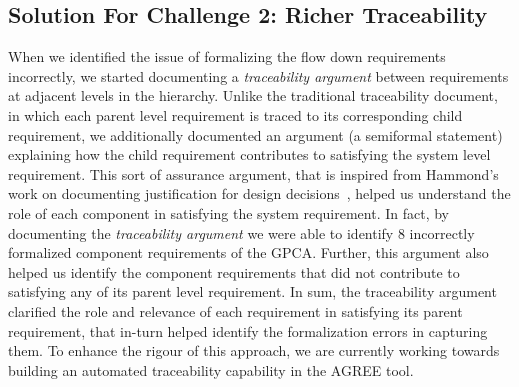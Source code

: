 %


\subsection {Solution For Challenge 2: Richer Traceability}

When we identified the issue of formalizing the flow down requirements incorrectly, we started documenting a \emph{traceability argument} between requirements at adjacent levels in the hierarchy. Unlike the traditional traceability document, in which each parent level requirement is traced to its corresponding child requirement, we additionally documented an argument (a semiformal statement) explaining how the child requirement contributes to satisfying the system level requirement. This sort of assurance argument, that is inspired from Hammond's work on documenting justification for design decisions~\cite{Hammond01:WiW}, helped us understand the role of each component in satisfying the system requirement. In fact, by documenting the \emph{traceability argument} we were able to identify 8 incorrectly formalized component requirements of the GPCA. Further, this argument also helped us identify the component requirements that did not contribute to satisfying any of its parent level requirement. In sum, the traceability argument clarified the role and relevance of each requirement in satisfying its parent requirement, that in-turn helped identify the formalization errors in capturing them. To enhance the rigour of this approach, we are currently working towards building an automated traceability capability in the AGREE tool.

